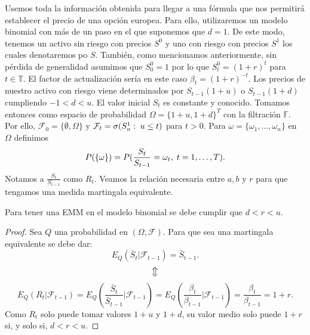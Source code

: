 Usemos toda la información obtenida para llegar a una fórmula que nos permitirá establecer el precio de una opción europea. Para ello, utilizaremos un modelo binomial con más de un paso en el que suponemos que $ d = 1 $. De este modo, tenemos un activo sin riesgo con precios $ S^0 $ y uno con riesgo con precios $ S^1$ los cuales denotaremos po $ S $. También, como mencionamos anteriormente, sin pérdida de generalidad asumimos que $ S^0_0  = 1$ por lo que $ S_t^0 =  (1+r)^t $ para $ t \in \mathbb{T} $. El factor de actualización sería en este caso $ \beta_t = (1+r)^{-t} $. Los precios de nuestro activo con riesgo viene determinados por $ S_{t-1}(1+u) $ o $ S_{t-1}(1+d) $ cumpliendo $ -1 < d < u $. El valor inicial $ S_t $ es constante y conocido. Tomamos entonces como espacio de probabilidad $ \Omega = \{1+u,1+d\}^T $ con la filtración $ \mathbb{F} $. Por ello, $ \mathcal{F}_0 = \{\emptyset, \Omega\} $ y $ \mathcal{F}_t = \sigma(S_u^1: \hspace{1mm} u \leq t) $ para $ t >0 $. Para $ \omega = \{\omega_1,\dots,\omega_n\} $ en $ \Omega $ definimos
\[
P(\{\omega\}) = P(\frac{S_t}{S_{t-1}} = \omega_t, \hspace{1mm} t=1,\dots,T).
\]
Notamos a $ \frac{S_t}{S_{t-1}} $ como $ R_t $. Veamos la relación necesaria entre $ a,b \text{ y } r$ para que tengamos una medida martingala equivalente.
\begin{lemaBox}
Para tener una EMM en el modelo binomial se debe cumplir que $ d < r < u $.
\end{lemaBox}
\begin{proof}
Sea $ Q $ una probabilidad en $ (\Omega, \mathcal{F}) $. Para que sea una martingala equivalente se debe dar:
\[
E_Q(\bar{S}_t | \mathcal{F}_{t-1}) = \bar{S}_{t-1}.
\]
\[
\big\Updownarrow
\]
\[
E_Q(R_t | \mathcal{F}_{t-1} ) = E_Q(\frac{\bar{S}_t}{\bar{S}_{t-1}} | \mathcal{F}_{t-1}) = E_Q(\frac{\beta_t}{\beta_{t-1}} | \mathcal{F}_{t-1}) = \frac{\beta_t}{\beta_{t-1}} = 1+r.
\]
Como $ R_t $ solo puede tomar valores $ 1+u $ y $ 1+d $, su valor medio solo puede $ 1+r $ si, y solo si, $ d < r < u $.
\end{proof}

